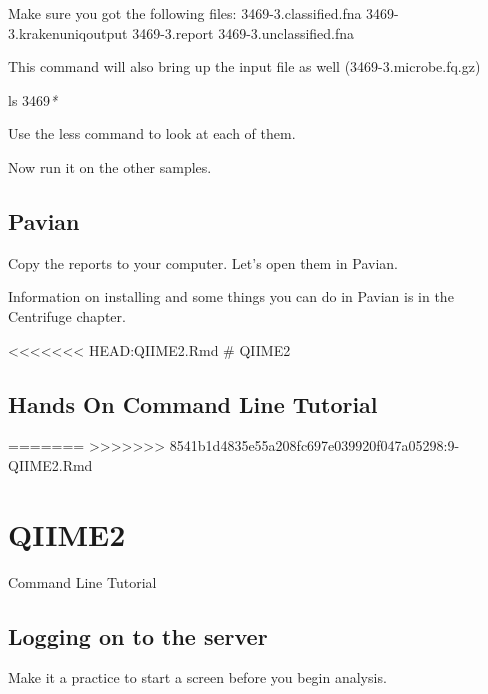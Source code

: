 \documentclass[
]{book}
\newenvironment{Shaded}{\begin{snugshade}}{\end{snugshade}}
\newcommand{\FunctionTok}[1]{\textcolor[rgb]{0.00,0.00,0.00}{#1}}
\newcommand{\NormalTok}[1]{#1}
\newcommand{\PreprocessorTok}[1]{\textcolor[rgb]{0.56,0.35,0.01}{\textit{#1}}}
\begin{document}
Make sure you got the following files:
3469-3.classified.fna
3469-3.krakenuniqoutput
3469-3.report
3469-3.unclassified.fna

This command will also bring up the input file as well (3469-3.microbe.fq.gz)

\begin{Shaded}
\begin{Highlighting}[]
\FunctionTok{ls}\NormalTok{ 3469}\PreprocessorTok{*}
\end{Highlighting}
\end{Shaded}

Use the less command to look at each of them.

Now run it on the other samples.

\hypertarget{pavian}{%
\section{Pavian}\label{pavian}}

Copy the reports to your computer.
Let's open them in Pavian.

Information on installing and some things you can do in Pavian is in the Centrifuge chapter.

\textless\textless\textless\textless\textless\textless\textless{} HEAD:QIIME2.Rmd
\# QIIME2

\hypertarget{hands-on-command-line-tutorial}{%
\section{Hands On Command Line Tutorial}\label{hands-on-command-line-tutorial}}

=======
\textgreater\textgreater\textgreater\textgreater\textgreater\textgreater\textgreater{} 8541b1d4835e55a208fc697e039920f047a05298:9-QIIME2.Rmd

\hypertarget{qiime2}{%
\chapter{QIIME2}\label{qiime2}}

Command Line Tutorial

\hypertarget{logging-on-to-the-server}{%
\section{Logging on to the server}\label{logging-on-to-the-server}}

Make it a practice to start a screen before you begin analysis.
\end{document}
